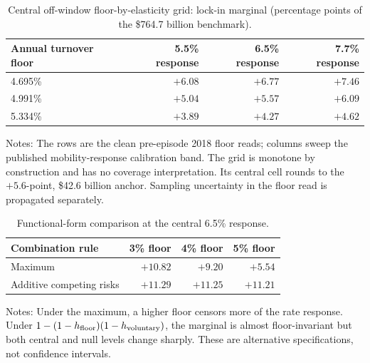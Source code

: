 \documentclass[12pt]{article}
\begin{document}
\begin{table}[tbp]
\centering
\small
\caption{Central off-window floor-by-elasticity grid: lock-in marginal (percentage points of the \$764.7 billion benchmark).}
\label{tab:floor-elasticity-grid}
\begin{threeparttable}
\begin{tabular}{@{}lrrr@{}}
\toprule
Annual turnover floor & 5.5\% response & 6.5\% response & 7.7\% response \\
\midrule
4.695\% & $+6.08$ & $+6.77$ & $+7.46$ \\
4.991\% & $+5.04$ & $+5.57$ & $+6.09$ \\
5.334\% & $+3.89$ & $+4.27$ & $+4.62$ \\
\bottomrule
\end{tabular}
\begin{tablenotes}[flushleft]\footnotesize
\item Notes: The rows are the clean pre-episode 2018 floor reads; columns sweep the published mobility-response calibration band. The grid is monotone by construction and has no coverage interpretation. Its central cell rounds to the $+5.6$-point, \$42.6 billion anchor. Sampling uncertainty in the floor read is propagated separately.
\end{tablenotes}
\end{threeparttable}
\end{table}

\begin{table}[tbp]
\centering
\small
\caption{Functional-form comparison at the central 6.5\% response.}
\label{tab:floor-form-compact}
\begin{threeparttable}
\begin{tabular}{@{}lrrr@{}}
\toprule
Combination rule & 3\% floor & 4\% floor & 5\% floor \\
\midrule
Maximum & $+10.82$ & $+9.20$ & $+5.54$ \\
Additive competing risks & $+11.29$ & $+11.25$ & $+11.21$ \\
\bottomrule
\end{tabular}
\begin{tablenotes}[flushleft]\footnotesize
\item Notes: Under the maximum, a higher floor censors more of the rate response. Under $1-(1-h_{\rm floor})(1-h_{\rm voluntary})$, the marginal is almost floor-invariant but both central and null levels change sharply. These are alternative specifications, not confidence intervals.
\end{tablenotes}
\end{threeparttable}
\end{table}
\end{document}
